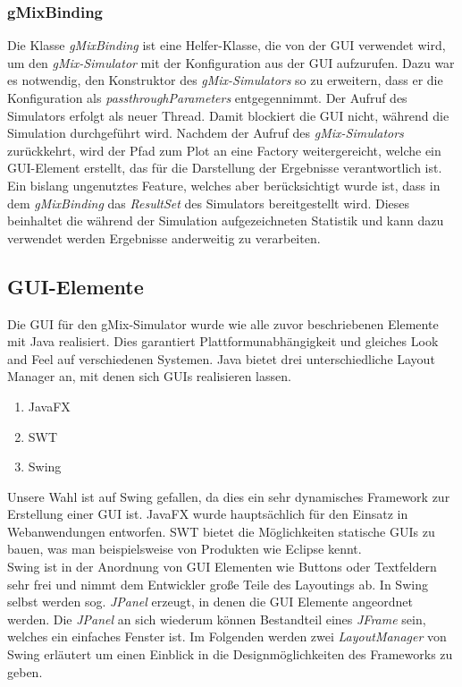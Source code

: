 \documentclass[a4paper, 11pt]{article} %
\begin{document}
\subsubsection{gMixBinding} %
\label{ssub:gmixbinding}
Die Klasse \emph{gMixBinding} ist eine Helfer-Klasse, die von der GUI verwendet wird, um den \emph{gMix-Simulator} mit der Konfiguration aus der GUI aufzurufen. Dazu war es notwendig, den Konstruktor des \emph{gMix-Simulators} so zu erweitern, dass er die Konfiguration als \emph{passthroughParameters} entgegennimmt. Der Aufruf des Simulators erfolgt als neuer Thread. Damit blockiert die GUI nicht, während die Simulation durchgeführt wird. Nachdem der Aufruf des \emph{gMix-Simulators} zurückkehrt, wird der Pfad zum Plot an eine Factory weitergereicht, welche ein GUI-Element erstellt, das für die Darstellung der Ergebnisse verantwortlich ist.\\

Ein bislang ungenutztes Feature, welches aber berücksichtigt wurde ist, dass in dem \emph{gMixBinding} das \emph{ResultSet} des Simulators bereitgestellt wird. Dieses beinhaltet die während der Simulation aufgezeichneten Statistik und kann dazu verwendet werden Ergebnisse anderweitig zu verarbeiten.\\

\subsection{GUI-Elemente}
\label{sub:guielemente}
Die GUI für den gMix-Simulator wurde wie alle zuvor beschriebenen Elemente mit Java realisiert. Dies garantiert Plattformunabhängigkeit und gleiches Look and Feel auf verschiedenen Systemen. Java bietet drei unterschiedliche Layout Manager an, mit denen sich GUIs realisieren lassen.
\begin{enumerate}
\item JavaFX
\item SWT
\item Swing
\end{enumerate}
Unsere Wahl ist auf Swing gefallen, da dies ein sehr dynamisches Framework zur Erstellung einer GUI ist. JavaFX wurde hauptsächlich für den Einsatz in Webanwendungen entworfen. SWT bietet die Möglichkeiten statische GUIs zu bauen, was man beispielsweise von Produkten wie  Eclipse kennt.\\

Swing ist in der Anordnung von GUI Elementen wie Buttons oder Textfeldern sehr frei und nimmt dem Entwickler große Teile des Layoutings ab. In Swing selbst werden sog. \emph{JPanel} erzeugt, in denen die GUI Elemente angeordnet werden. Die \emph{JPanel} an sich wiederum können Bestandteil eines \emph{JFrame} sein, welches ein einfaches Fenster ist. Im Folgenden werden zwei \emph{LayoutManager} von Swing erläutert um einen Einblick in die Designmöglichkeiten des Frameworks zu geben.
\end{document}
